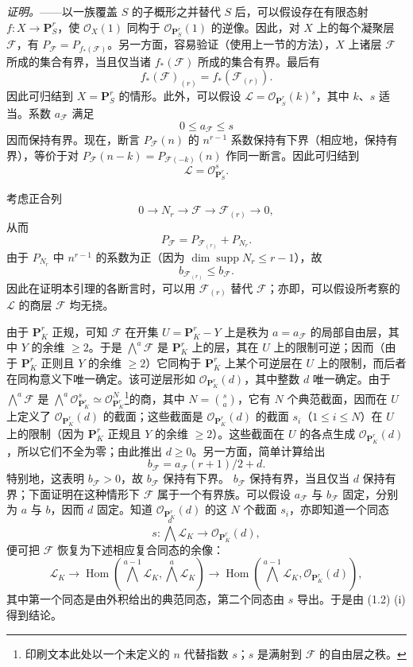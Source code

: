 \emph{证明。}——以一族覆盖 $S$ 的子概形之并替代 $S$ 后，可以假设存在有限态射
$f:X\longrightarrow\mathbf P^r_S$，使 $\mathcal O_X(1)$ 同构于
$\mathcal O_{\mathbf P^r_S}(1)$ 的逆像。因此，对 $X$ 上的每个凝聚层
$\mathcal F$，有
$P_{\mathcal F}=P_{f_*(\mathcal F)}$。另一方面，容易验证（使用上一节的方法），$X$ 上诸层 $\mathcal F$ 所成的集合有界，当且仅当诸
$f_*(\mathcal F)$ 所成的集合有界。最后有
\[
f_*(\mathcal F)_{(r)}=f_*(\mathcal F_{(r)}).
\]
因此可归结到 $X=\mathbf P^r_S$ 的情形。此外，可以假设
$\mathcal L=\mathcal O_{\mathbf P^r_S}(k)^s$，其中 $k$、$s$ 适当。系数
$a_{\mathcal F}$ 满足
\[
0\leq a_{\mathcal F}\leq s
\]
因而保持有界。现在，断言 $P_{\mathcal F}(n)$ 的 $n^{r-1}$ 系数保持有下界（相应地，保持有界），等价于对
$P_{\mathcal F}(n-k)=P_{\mathcal F(-k)}(n)$ 作同一断言。因此可归结到
\[
\mathcal L=\mathcal O_{\mathbf P^r_S}^{s}.
\]

考虑正合列
\[
0\longrightarrow N_r\longrightarrow\mathcal F
\longrightarrow\mathcal F_{(r)}\longrightarrow0,
\]
从而
\[
P_{\mathcal F}=P_{\mathcal F_{(r)}}+P_{N_r}.
\]
由于 $P_{N_r}$ 中 $n^{r-1}$ 的系数为正（因为
$\dim\operatorname{supp}N_r\leq r-1$），故
\[
b_{\mathcal F_{(r)}}\leq b_{\mathcal F}.
\]
因此在证明本引理的各断言时，可以用 $\mathcal F_{(r)}$ 替代
$\mathcal F$；亦即，可以假设所考察的 $\mathcal L$ 的商层
$\mathcal F$ 均无挠。

由于 $\mathbf P^r_K$ 正规，可知 $\mathcal F$ 在开集
$U=\mathbf P^r_K-Y$ 上是秩为 $a=a_{\mathcal F}$ 的局部自由层，其中
$Y$ 的余维 $\geq2$。于是 $\bigwedge^a\mathcal F$ 是
$\mathbf P^r_K$ 上的层，其在 $U$ 上的限制可逆；因而（由于
$\mathbf P^r_K$ 正则且 $Y$ 的余维 $\geq2$）它同构于
$\mathbf P^r_K$ 上某个可逆层在 $U$ 上的限制，而后者在同构意义下唯一确定。该可逆层形如
$\mathcal O_{\mathbf P^r_K}(d)$，其中整数 $d$ 唯一确定。由于
$\bigwedge^a\mathcal F$ 是
$\bigwedge^a\mathcal O_{\mathbf P^r_K}^{s}\simeq
\mathcal O_{\mathbf P^r_K}^{N}$\footnote{印刷文本此处以一个未定义的
$n$ 代替指数 $s$；$s$ 是满射到 $\mathcal F$ 的自由层之秩。}的商，其中
$N=\binom{s}{a}$，它有 $N$ 个典范截面，因而在 $U$ 上定义了
$\mathcal O_{\mathbf P^r_K}(d)$ 的截面；这些截面是
$\mathcal O_{\mathbf P^r_K}(d)$ 的截面 $s_i$（$1\leq i\leq N$）在
$U$ 上的限制（因为 $\mathbf P^r_K$ 正规且 $Y$ 的余维 $\geq2$）。这些截面在 $U$ 的各点生成
$\mathcal O_{\mathbf P^r_K}(d)$，所以它们不全为零；由此推出
$d\geq0$。另一方面，简单计算给出
\[
b_{\mathcal F}=a_{\mathcal F}(r+1)/2+d.
\]
特别地，这表明 $b_{\mathcal F}>0$，故 $b_{\mathcal F}$ 保持有下界。
$b_{\mathcal F}$ 保持有界，当且仅当 $d$ 保持有界；下面证明在这种情形下 $\mathcal F$ 属于一个有界族。可以假设
$a_{\mathcal F}$ 与 $b_{\mathcal F}$ 固定，分别为 $a$ 与 $b$，因而
$d$ 固定。知道 $\mathcal O_{\mathbf P^r_K}(d)$ 的这 $N$ 个截面
$s_i$，亦即知道一个同态
\[
s:\bigwedge^a\mathcal L_K\longrightarrow\mathcal O_{\mathbf P^r_K}(d),
\]
便可把 $\mathcal F$ 恢复为下述相应复合同态的余像：
\[
\mathcal L_K\longrightarrow
\operatorname{Hom}\!\left(\bigwedge^{a-1}\mathcal L_K,
\bigwedge^a\mathcal L_K\right)\longrightarrow
\operatorname{Hom}\!\left(\bigwedge^{a-1}\mathcal L_K,
\mathcal O_{\mathbf P^r_K}(d)\right),
\]
其中第一个同态是由外积给出的典范同态，第二个同态由 $s$ 导出。于是由
(1.2) (i) 得到结论。

